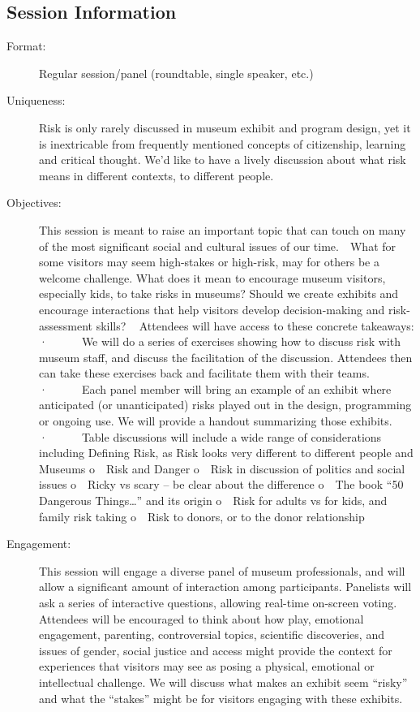 \documentclass{report}
\begin{document}
              \subsection*{Session Information}
                \begin{description}
                  \item [Format:] Regular session/panel (roundtable, single speaker, etc.)
							    
							    \item [Uniqueness:]Risk is only rarely discussed in museum exhibit and program design, yet it is inextricable from frequently mentioned concepts of citizenship, learning and critical thought. We'd like to have a lively discussion about what risk means in different contexts, to different people.
							    \item [Objectives:]This session is meant to raise an important topic that can touch on many of the most significant social and cultural issues of our time.  What for some visitors may seem high-stakes or high-risk, may for others be a welcome challenge. What does it mean to encourage museum visitors, especially kids, to take risks in museums? Should we create exhibits and encourage interactions that help visitors develop decision-making and risk-assessment skills?
 
Attendees will have access to these concrete takeaways:
·      We will do a series of exercises showing how to discuss risk with museum staff, and discuss the facilitation of the discussion. Attendees then can take these exercises back and facilitate them with their teams. 
·      Each panel member will bring an example of an exhibit where anticipated (or unanticipated) risks played out in the design, programming or ongoing use. We will provide a handout summarizing those exhibits. 
·      Table discussions will include a wide range of considerations including Defining Risk, as Risk looks very different to different people and Museums
o  Risk and Danger
o  Risk in discussion of politics and social issues 
o  Ricky vs scary – be clear about the difference
o  The book “50 Dangerous Things…” and its origin
o  Risk for adults vs for kids, and family risk taking
o  Risk to donors, or to the donor relationship
							    \item [Engagement:]This session will engage a diverse panel of museum professionals, and will allow a significant amount of interaction among participants. Panelists will ask a series of interactive questions, allowing real-time on-screen voting. 
 
Attendees will be encouraged to think about how play, emotional engagement, parenting, controversial topics, scientific discoveries, and issues of gender, social justice and access might provide the context for experiences that visitors may see as posing a physical, emotional or intellectual challenge. We will discuss what makes an exhibit seem “risky” and what the “stakes” might be for visitors engaging with these exhibits.

\end{description}
\end{document}
